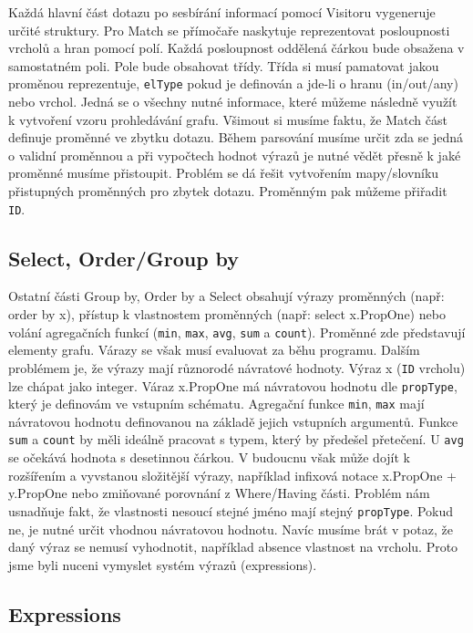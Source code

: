 Každá hlavní část dotazu po sesbírání informací pomocí Visitoru vygeneruje určité struktury.
Pro Match se přímočaře naskytuje reprezentovat posloupnosti vrcholů a hran pomocí polí.
Každá posloupnost oddělená čárkou bude obsažena v samostatném poli.
Pole bude obsahovat třídy.
Třída si musí pamatovat jakou proměnou reprezentuje, \verb+elType+ pokud je definován a jde-li o hranu (in/out/any) nebo vrchol.
Jedná se o všechny nutné informace, které můžeme následně využít k vytvoření vzoru prohledávání grafu.
Všimout si musíme faktu, že Match část definuje proměnné ve zbytku dotazu.
Během parsování musíme určit zda se jedná o validní proměnnou a při vypočtech hodnot výrazů je nutné vědět přesně k jaké proměnné musíme přistoupit.
Problém se dá řešit vytvořením mapy/slovníku přistupných proměnných pro zbytek dotazu.
Proměnným pak můžeme přiřadit \verb+ID+.

\subsection{Select, Order/Group by}

Ostatní části Group by, Order by a Select obsahují výrazy proměnných (např: order by x), přístup k vlastnostem proměnných (např: select x.PropOne) nebo volání agregačních funkcí (\verb+min+, \verb+max+, \verb+avg+, \verb+sum+ a \verb+count+).
Proměnné zde představují elementy grafu.
Várazy se však musí evaluovat za běhu programu.
Dalším problémem je, že výrazy mají různorodé návratové hodnoty.
Výraz x (\verb+ID+ vrcholu) lze chápat jako integer.
Váraz x.PropOne má návratovou hodnotu dle \verb+propType+, který je definovám ve vstupním schématu.
Agregační funkce \verb+min+, \verb+max+ mají návratovou hodnotu definovanou na základě jejich vstupních argumentů.
Funkce \verb+sum+ a \verb+count+ by měli ideálně pracovat s typem, který by předešel přetečení.
U \verb+avg+ se očekává hodnota s desetinnou čárkou.  
V budoucnu však může dojít k rozšířením a vyvstanou složitější výrazy, například infixová notace x.PropOne + y.PropOne nebo zmiňované porovnání z Where/Having části.
Problém nám usnadňuje fakt, že vlastnosti nesoucí stejné jméno mají stejný \verb+propType+.
Pokud ne, je nutné určit vhodnou návratovou hodnotu.
Navíc musíme brát v potaz, že daný výraz se nemusí vyhodnotit, například absence vlastnost na vrcholu.
Proto jsme byli nuceni vymyslet systém výrazů (expressions).

\subsection{Expressions} \label{anal.expressions}

